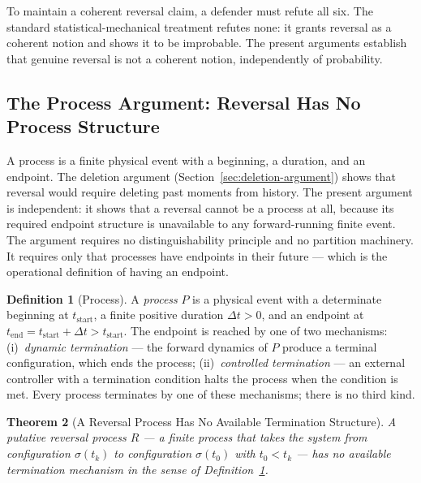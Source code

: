 \documentclass[twocolumn,10pt,a4paper]{article}
\theoremstyle{thmstyle}
\newtheorem{theorem}{Theorem}[section]
\theoremstyle{definition}
\newtheorem{definition}[theorem]{Definition}
\theoremstyle{remark}
\begin{document}
To maintain a coherent reversal claim, a defender must refute all six. The standard statistical-mechanical treatment refutes none: it grants reversal as a coherent notion and shows it to be improbable. The present arguments establish that genuine reversal is not a coherent notion, independently of probability.

\subsection{The Process Argument: Reversal Has No Process Structure}
\label{sec:process-argument}

A process is a finite physical event with a beginning, a duration, and an endpoint. The deletion argument (Section~\ref{sec:deletion-argument}) shows that reversal would require deleting past moments from history. The present argument is independent: it shows that a reversal cannot be a process at all, because its required endpoint structure is unavailable to any forward-running finite event. The argument requires no distinguishability principle and no partition machinery. It requires only that processes have endpoints in their future --- which is the operational definition of having an endpoint.

\begin{definition}[Process]
\label{def:process}
A \emph{process} $P$ is a physical event with a determinate beginning at $t_{\mathrm{start}}$, a finite positive duration $\Delta t > 0$, and an endpoint at $t_{\mathrm{end}} = t_{\mathrm{start}} + \Delta t > t_{\mathrm{start}}$. The endpoint is reached by one of two mechanisms: (i)~\emph{dynamic termination} --- the forward dynamics of $P$ produce a terminal configuration, which ends the process; (ii)~\emph{controlled termination} --- an external controller with a termination condition halts the process when the condition is met. Every process terminates by one of these mechanisms; there is no third kind.
\end{definition}

\begin{theorem}[A Reversal Process Has No Available Termination Structure]
\label{thm:reversal-no-process}
A putative reversal process $R$ --- a finite process that takes the system from configuration $\sigma(t_k)$ to configuration $\sigma(t_0)$ with $t_0 < t_k$ --- has no available termination mechanism in the sense of Definition~\ref{def:process}.
\end{theorem}
\end{document}
